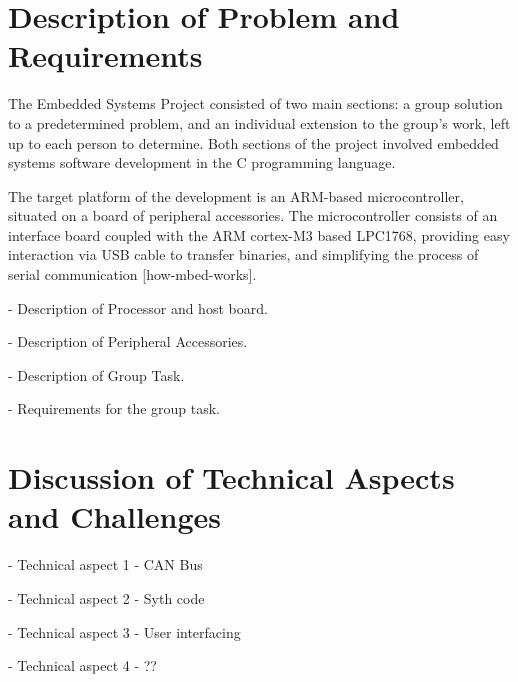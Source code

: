 \section{Description of Problem and Requirements}
The Embedded Systems Project consisted of two main sections: a group solution 
to a predetermined problem, and an individual extension to the group's work, 
left up to each person to determine. Both sections of the project involved 
embedded systems software development in the C programming language. 

The target platform of the development is an ARM-based microcontroller, 
situated on a board of peripheral accessories. The microcontroller consists of 
an interface board coupled with the ARM cortex-M3 based LPC1768, providing easy 
interaction via USB cable to transfer binaries, and simplifying the process of 
serial communication [how-mbed-works].

- Description of Processor and host board. 

- Description of Peripheral Accessories.

- Description of Group Task.

- Requirements for the group task.


\section{Discussion of Technical Aspects and Challenges}

- Technical aspect 1 - CAN Bus 

- Technical aspect 2 - Syth code 

- Technical aspect 3 - User interfacing 

- Technical aspect 4 - ??

